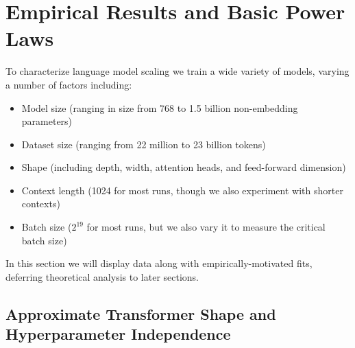 \documentclass[english]{article}
\renewcommand{\arraystretch}{1.5}
\begin{document}
\section{Empirical Results and Basic Power Laws}
\label{sec:Empirical}

To characterize language model scaling we train a wide variety of models, varying a number of factors including:
\begingroup
\renewcommand{\arraystretch}{1.1}
\begin{itemize}
\item Model size (ranging in size from 768 to 1.5 billion non-embedding parameters)
\item Dataset size (ranging from 22 million to 23 billion tokens)
\item Shape (including depth, width, attention heads, and feed-forward dimension)
\item Context length (1024 for most runs, though we also experiment with shorter contexts)
\item Batch size ($2^{19}$ for most runs, but we also vary it to measure the critical batch size)
\end{itemize}
\endgroup

In this section we will display data along with empirically-motivated fits, deferring theoretical analysis to later sections.  

\subsection{Approximate Transformer Shape and Hyperparameter Independence}
\label{sec:ShapeIndependence}
\end{document}
